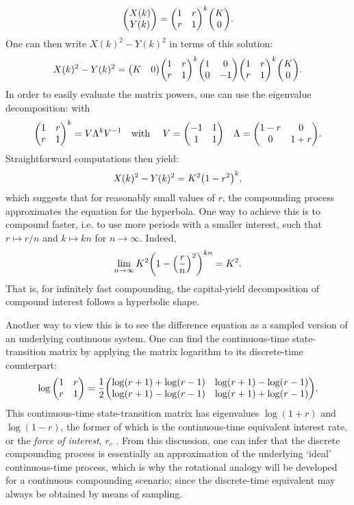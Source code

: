 $$ \mqty(X(k)\\Y(k)) = \mqty(1& r \\ r & 1)^k\mqty(\ininv\\0). $$
One can then write $X(k)^2 - Y(k)^2$ in terms of this solution:
$$ X(k)^2 - Y(k)^2 = \mqty(K & 0)\mqty(1& r \\ r & 1)^k\mqty(1 & 0\\0 & -1)\mqty(1& r \\ r & 1)^k\mqty(K\\0).$$
In order to easily evaluate the matrix powers, one can use the eigenvalue decomposition:
with
$$ \mqty(1 & r \\  r & 1)^k = V\Lambda^k V^{-1} \qq{with } V = \mqty(-1 & 1 \\ 1 & 1) \quad \Lambda = \mqty(1 - r & 0\\0 & 1 + r). $$
Straightforward computations then yield:
$$ X(k)^2 - Y(k)^2 = K^2\qty(1 - r^2)^k, $$
which suggests that for reasonably small values of $r$, the compounding process approximates the equation for the hyperbola. One way to achieve this is to compound faster, i.e. to use more periods with a smaller interest, such that $r \mapsto r/n$ and $k \mapsto kn$ for $n \to \infty$. Indeed, 
$$ \lim_{n\to\infty} K^2\qty(1 - \qty(\frac{r}{n})^2)^{kn} = K^2. $$
That is, for infinitely fast compounding, the capital-yield decomposition of compound interest follows a hyperbolic shape.

Another way to view this is to see the difference equation as a sampled version of an underlying continuous system. One can find the continuous-time state-transition matrix by applying the matrix logarithm to its discrete-time counterpart:
    $$ \log \mqty(1 & r \\ r & 1) = 
        \frac{1}{2}\mqty(\log(r + 1) + \log(r - 1) & \log(r + 1) - \log(r - 1)\\
                         \log(r + 1) - \log(r - 1) & \log(r + 1) + \log(r - 1)). $$
This continuous-time state-transition matrix has eigenvalues $\log(1 + r)$ and $\log(1 - r)$, the former of which is the continuous-time equivalent interest rate, or the \emph{force of interest}, $r_c$ \cite{Kellison1991}. From this discussion, one can infer that the discrete compounding process is essentially an approximation of the underlying `ideal' continuous-time process, which is why the rotational analogy will be developed for a continuous compounding scenario; since the discrete-time equivalent may always be obtained by means of sampling.

